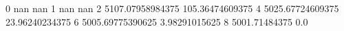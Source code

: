 0 nan nan
1 nan nan
2 5107.07958984375 105.36474609375
4 5025.67724609375 23.96240234375
6 5005.69775390625 3.98291015625
8 5001.71484375 0.0
